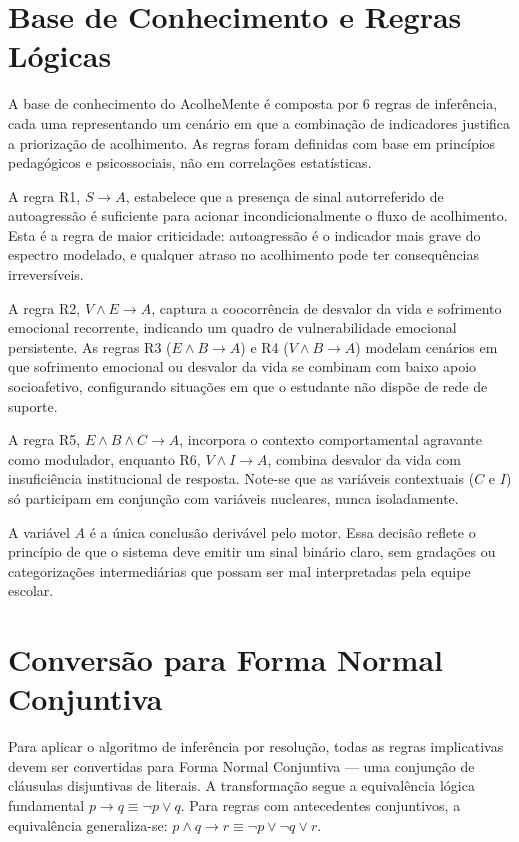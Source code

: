 \documentclass[
    12pt,
    openright,
    oneside,
    a4paper,
    english,
    brazil
]{abntex2}
\begin{document}
\chapter{Base de Conhecimento e Regras Lógicas}

A base de conhecimento do AcolheMente é composta por 6 regras de inferência, cada uma representando um cenário em que a combinação de indicadores justifica a priorização de acolhimento. As regras foram definidas com base em princípios pedagógicos e psicossociais, não em correlações estatísticas.

A regra R1, $S \rightarrow A$, estabelece que a presença de sinal autorreferido de autoagressão é suficiente para acionar incondicionalmente o fluxo de acolhimento. Esta é a regra de maior criticidade: autoagressão é o indicador mais grave do espectro modelado, e qualquer atraso no acolhimento pode ter consequências irreversíveis.

A regra R2, $V \land E \rightarrow A$, captura a coocorrência de desvalor da vida e sofrimento emocional recorrente, indicando um quadro de vulnerabilidade emocional persistente. As regras R3 ($E \land B \rightarrow A$) e R4 ($V \land B \rightarrow A$) modelam cenários em que sofrimento emocional ou desvalor da vida se combinam com baixo apoio socioafetivo, configurando situações em que o estudante não dispõe de rede de suporte.

A regra R5, $E \land B \land C \rightarrow A$, incorpora o contexto comportamental agravante como modulador, enquanto R6, $V \land I \rightarrow A$, combina desvalor da vida com insuficiência institucional de resposta. Note-se que as variáveis contextuais ($C$ e $I$) só participam em conjunção com variáveis nucleares, nunca isoladamente.

A variável $A$ é a única conclusão derivável pelo motor. Essa decisão reflete o princípio de que o sistema deve emitir um sinal binário claro, sem gradações ou categorizações intermediárias que possam ser mal interpretadas pela equipe escolar.



\chapter{Conversão para Forma Normal Conjuntiva}

Para aplicar o algoritmo de inferência por resolução, todas as regras implicativas devem ser convertidas para Forma Normal Conjuntiva --- uma conjunção de cláusulas disjuntivas de literais. A transformação segue a equivalência lógica fundamental $p \rightarrow q \equiv \neg p \lor q$. Para regras com antecedentes conjuntivos, a equivalência generaliza-se: $p \land q \rightarrow r \equiv \neg p \lor \neg q \lor r$.
\end{document}
